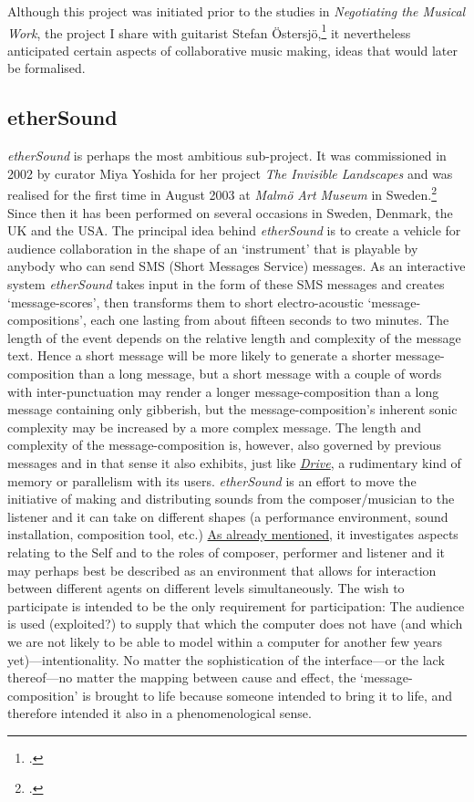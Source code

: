 Although this project was initiated prior to the studies in \emph{Negotiating the Musical Work}, the project I share with guitarist Stefan \"{O}stersj\"{o},\footcite{frisk-ost06} it nevertheless anticipated certain aspects of collaborative music making, ideas that would later be formalised.

\subsection{etherSound}
\label{sec:ethersound-2003}



\emph{etherSound} is perhaps the most ambitious sub-project. It was commissioned in 2002 by curator Miya Yoshida for her project \emph{The Invisible Landscapes} and was realised for the first time in August 2003 at \emph{Malm\"{o} Art Museum} in Sweden.\footcite[Yoshida's PhD thesis includes a chapter on \emph{etherSound}.][C.5, ]{yoshida06} Since then it has been performed on several occasions in Sweden, Denmark, the UK and the USA. The principal idea behind \emph{etherSound} is to create a vehicle for audience collaboration in the shape of an `instrument' that is playable by anybody who can send SMS (Short Messages Service) messages. As an interactive system \emph{etherSound} takes input in the form of these SMS messages and creates `message-scores', then transforms them to short electro-acoustic `message-compositions', each one lasting from about fifteen seconds to two minutes. The length of the event depends on the relative length and complexity of the message text. Hence a short message will be more likely to generate a shorter message-composition than a long message, but a short message with a couple of words with inter-punctuation may render a longer message-composition than a long message containing only gibberish, but the message-composition's inherent sonic complexity may be increased by a more complex message. The length and complexity of the message-composition is, however, also governed by previous messages and in that sense it also exhibits, just like \emph{\hyperref[sec:drive-2003]{Drive}}, a rudimentary kind of memory or parallelism with its users. \emph{etherSound} is an effort to move the initiative of making and distributing sounds from the composer/musician to the listener and it can take on different shapes (a performance environment, sound installation, composition tool, etc.) \hyperref[sec:summary]{As already mentioned}, it investigates aspects relating to the Self and to the roles of composer, performer and listener and it may perhaps best be described as an environment that allows for interaction between different agents on different levels simultaneously. The wish to participate is intended to be the only requirement for participation: The audience is used (exploited?) to supply that which the computer does not have (and which we are not likely to be able to model within a computer for another few years yet)---intentionality. No matter the sophistication of the interface---or the lack thereof---no matter the mapping between cause and effect, the `message-composition' is brought to life because someone intended to bring it to life, and therefore intended it also in a phenomenological sense.

